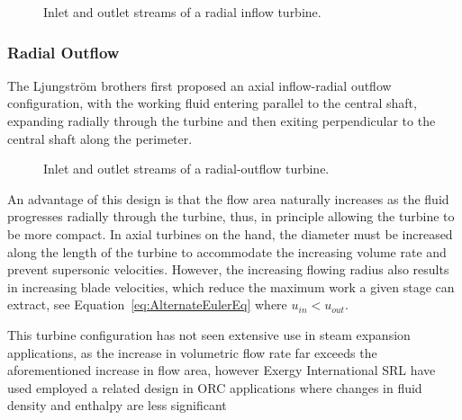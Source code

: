 
            \begin{figure}[H]
                \centering
                
                \caption{Inlet and outlet streams of a radial inflow turbine.}
                \label{fig:prosim_litrev_RadialAxial_turbine}
            \end{figure}

        \subsubsection{Radial Outflow}
            The Ljungström brothers \cite{Dick2015} first proposed an axial inflow-radial outflow configuration, with the working fluid entering parallel to the central shaft, expanding radially through the turbine and then exiting perpendicular to the central shaft along the perimeter.

            \begin{figure}[H]
                \centering
                
                \caption{Inlet and outlet streams of a radial-outflow turbine.}
                \label{fig:prosim_litrev_AxialRadial_turbine}
            \end{figure}

            An advantage of this design is that the flow area naturally increases as the fluid progresses radially through the turbine, thus, in principle allowing the turbine to be more compact. In axial turbines on the hand, the diameter must be increased along the length of the turbine to accommodate the increasing volume rate and prevent supersonic velocities. However, the increasing flowing radius also results in increasing blade velocities, which reduce the maximum work a given stage can extract, see Equation~\ref{eq:AlternateEulerEq} where \(u_{in}<u_{out}\).
            
            This turbine configuration has not seen extensive use in steam expansion applications, as the increase in volumetric flow rate far exceeds the aforementioned increase in flow area, however Exergy International SRL \cite{Exergy2024} have used employed a related design in \ac{ORC} applications where changes in fluid density and enthalpy are less significant    

